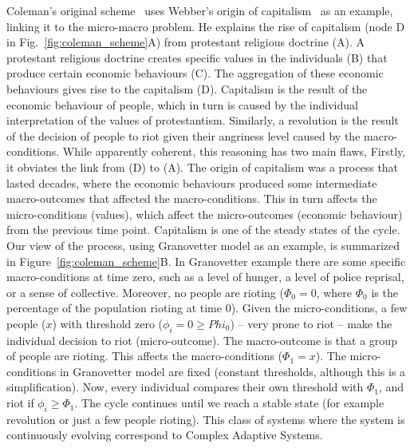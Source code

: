 Coleman’s original scheme~\cite{coleman1990} uses Webber’s origin of capitalism~\citep{weber1904} as an example, 
linking it to the micro-macro problem. 
He explains the rise of capitalism (node D in Fig.~\ref{fig:coleman_scheme}A) from protestant religious doctrine (A). 
A protestant religious doctrine creates specific values in the individuals (B) that produce certain economic behaviours (C). 
The aggregation of these economic behaviours gives rise to the capitalism (D). 
Capitalism is the result of the economic behaviour of people, which in turn is caused by the individual interpretation of the values of protestantism.
Similarly, a revolution is the result of the decision of people to riot given their angriness level caused by the macro-conditions.
While apparently coherent, this reasoning has two main flaws, 
Firstly, it obviates the link from (D) to (A). 
The origin of capitalism was a process that lasted decades, 
where the economic behaviours produced some intermediate macro-outcomes that affected the macro-conditions. 
This in turn affects the micro-conditions (values), 
which affect the micro-outcomes (economic behaviour) from the previous time point. 
Capitalism is one of the steady states of the cycle.
Our view of the process, using Granovetter model as an example, is summarized in Figure~\ref{fig:coleman_scheme}B. 
In Granovetter example there are some specific macro-conditions at time zero, 
such as a level of hunger, a level of police reprisal, or a sense of collective.
Moreover, no people are rioting ($\Phi_0 = 0$, where $\Phi_0$ is the percentage of the population rioting at time 0). 
Given the micro-conditions, a few people ($x$) with threshold zero ($\phi_i = 0 \geq Phi_0$) -- very prone to riot -- make the individual decision to riot (micro-outcome). 
The macro-outcome is that a group of people are rioting. 
This affects the macro-conditions ($\Phi_1 = x$). 
The micro-conditions in Granovetter model are fixed (constant thresholds, although this is a simplification).
Now, every individual compares their own threshold with $\Phi_1$, and riot if $\phi_i \geq \Phi_1$. 
The cycle continues until we reach a stable state (for example revolution or just a few people rioting).
This class of systems where the system is continuously evolving correspond to Complex Adaptive Systems.


